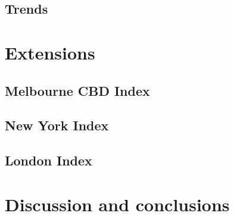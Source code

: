 \documentclass[preprint, 3p,
authoryear]{elsarticle} %
\begin{document}
\hypertarget{trends}{%
\subsection{Trends}\label{trends}}

\hypertarget{extensions}{%
\section{Extensions}\label{extensions}}

\hypertarget{melbourne-cbd-index}{%
\subsection{Melbourne CBD Index}\label{melbourne-cbd-index}}

\hypertarget{new-york-index}{%
\subsection{New York Index}\label{new-york-index}}

\hypertarget{london-index}{%
\subsection{London Index}\label{london-index}}

\hypertarget{discussion-and-conclusions}{%
\section{Discussion and conclusions}\label{discussion-and-conclusions}}

\renewcommand\refname{References}

\end{document}
